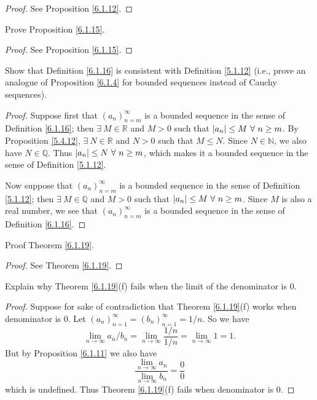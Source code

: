 \begin{proof}
See Proposition \ref{6.1.12}.
\end{proof}

\begin{exercise}\label{ex 6.1.6}
Prove Proposition \ref{6.1.15}.
\end{exercise}

\begin{proof}
See Proposition \ref{6.1.15}.
\end{proof}

\begin{exercise}\label{ex 6.1.7}
Show that Definition \ref{6.1.16} is consistent with Definition \ref{5.1.12}
(i.e., prove an analogue of Proposition \ref{6.1.4} for bounded sequences instead of Cauchy sequences).
\end{exercise}

\begin{proof}
Suppose first that \((a_n)_{n = m}^\infty\) is a bounded sequence in the sense of Definition \ref{6.1.16};
then \(\exists\ M \in \mathds{R}\) and \(M > 0\) such that \(\abs*{a_n} \leq M \ \forall\ n \geq m\).
By Proposition \ref{5.4.12}, \(\exists\ N \in \mathds{R}\) and \(N > 0\) such that \(M \leq N\).
Since \(N \in \mathds{N}\), we also have \(N \in \mathds{Q}\).
Thus \(\abs*{a_n} \leq N \ \forall\ n \geq m\), which makes it a bounded sequence in the sense of Definition \ref{5.1.12}.

Now suppose that \((a_n)_{n = m}^\infty\) is a bounded sequence in the sense of Definition \ref{5.1.12};
then \(\exists\ M \in \mathds{Q}\) and \(M > 0\) such that \(\abs*{a_n} \leq M \ \forall\ n \geq m\).
Since \(M\) is also a real number, we see that \((a_n)_{n = m}^\infty\) is a bounded sequence in the sense of Definition \ref{6.1.16}.
\end{proof}

\begin{exercise}\label{ex 6.1.8}
Proof Theorem \ref{6.1.19}.
\end{exercise}

\begin{proof}
See Theorem \ref{6.1.19}.
\end{proof}

\begin{exercise}\label{ex 6.1.9}
Explain why Theorem \ref{6.1.19}(f) fails when the limit of the denominator is \(0\).
\end{exercise}

\begin{proof}
Suppose for sake of contradiction that Theorem \ref{6.1.19}(f) works when denominator is \(0\).
Let \((a_n)_{n = 1}^\infty = (b_n)_{n = 1}^\infty = 1 / n\).
So we have
\[
    \lim_{n \to \infty} a_n / b_n = \lim_{n \to \infty} \frac{1 / n}{1 / n} = \lim_{n \to \infty} 1 = 1.
\]
But by Proposition \ref{6.1.11} we also have
\[
    \frac{\lim_{n \to \infty} a_n}{\lim_{n \to \infty} b_n} = \frac{0}{0}
\]
which is undefined.
Thus Theorem \ref{6.1.19}(f) fails when denominator is \(0\).
\end{proof}

